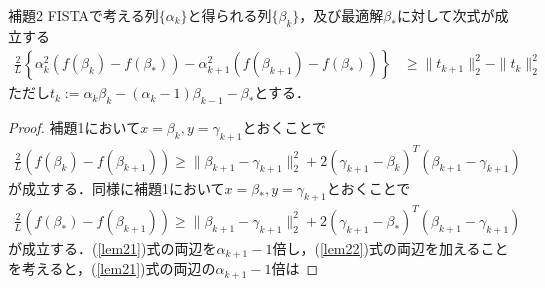 \documentclass{jsarticle}
\theoremstyle{definition}
\theoremstyle{mystyle} %
\begin{document}
\begin{itembox}[l]{補題2}
FISTAで考える列$\{\alpha_k\}$と得られる列$\{\beta_k\}$，及び最適解$\beta_{\ast}$に対して次式が成立する
\begin{align*}
\frac{2}{L}\left\{\alpha_k^2(f(\beta_k)-f(\beta_{\ast}))-\alpha_{k+1}^2(f(\beta_{k+1})-f(\beta_{\ast}))\right\}&\geq \|t_{k+1}\|_2^2-\|t_k\|_2^2
\end{align*}
ただし$t_k:=\alpha_k\beta_k-(\alpha_k-1)\beta_{k-1}-\beta_{\ast}$とする．
\end{itembox}
\begin{proof}
補題1において$x=\beta_k,y=\gamma_{k+1}$とおくことで
\begin{align}
\label{lem21}
\frac{2}{L}(f(\beta_k)-f(\beta_{k+1}))\geq \|\beta_{k+1}-\gamma_{k+1}\|_2^2+2(\gamma_{k+1}-\beta_k)^T(\beta_{k+1}-\gamma_{k+1})
\end{align}
が成立する．同様に補題1において$x=\beta_{\ast},y=\gamma_{k+1}$とおくことで
\begin{align}
\label{lem22}
\frac{2}{L}(f(\beta_{\ast})-f(\beta_{k+1}))\geq \|\beta_{k+1}-\gamma_{k+1}\|_2^2+2(\gamma_{k+1}-\beta_{\ast})^T(\beta_{k+1}-\gamma_{k+1})
\end{align}
が成立する．(\ref{lem21})式の両辺を$\alpha_{k+1}-1$倍し，(\ref{lem22})式の両辺を加えることを考えると，(\ref{lem21})式の両辺の$\alpha_{k+1}-1$倍は


\end{proof}
\end{document}
